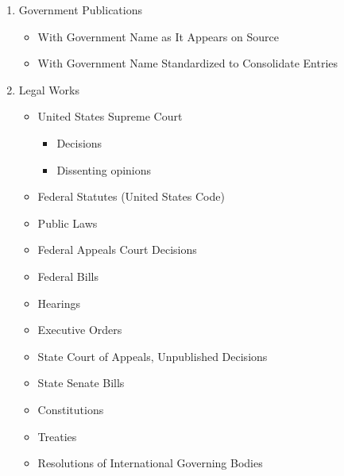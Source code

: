 \documentclass{article}
\begin{document}
\begin{enumerate}
	\item Government Publications
	\begin{itemize}
		\item With Government Name as It Appears on Source
		\item With Government Name Standardized to Consolidate Entries
	\end{itemize}
	
	\item Legal Works
	\begin{itemize}
		\item United States Supreme Court
		\begin{itemize}
			\item Decisions
			\item Dissenting opinions
		\end{itemize}
		\item Federal Statutes (United States Code)
		\item Public Laws
		\item Federal Appeals Court Decisions
		\item Federal Bills
		\item Hearings
		\item Executive Orders
		\item State Court of Appeals, Unpublished Decisions
		\item State Senate Bills
		\item Constitutions
		\item Treaties
		\item Resolutions of International Governing Bodies
	\end{itemize}
	
\end{enumerate}

\end{document}
